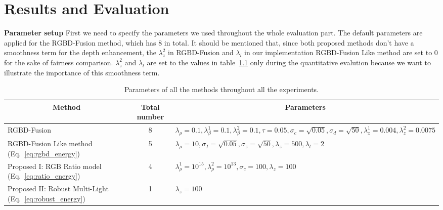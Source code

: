 \chapter{Results and Evaluation} \label{chap:result}
\textbf{Parameter setup}
First we need to specify the parameters we used throughout the whole evaluation part. 
The default parameters are applied for the RGBD-Fusion method, which has 8 in total. 
It should be mentioned that, since both proposed methods don't have a smoothness term for the depth enhancement, the $\lambda_z^2$ in RGBD-Fusion and $\lambda_l$ in our implementation RGBD-Fusion Like method are set to 0 for the sake of fairness comparison.
$\lambda_z^2$ and $\lambda_l$ are set to the values in table~\ref{tab:parameter_setup} only during the quantitative evalution because we want to illustrate the importance of this smoothness term.
\begin{table}[!ht]
\caption{Parameters of all the methods throughout all the experiments.}
\label{tab:parameter_setup}
\centering
\begin{tabular}{|m{4cm} |m{1.5cm} |m{7cm}|}
\hline
\multicolumn{1}{|c|}{Method}                               & \multicolumn{1}{c|}{Total number} & \multicolumn{1}{c|}{Parameters}                                                                                                                                          \\ \hline
RGBD-Fusion~\cite{or2015rgbd} & \multicolumn{1}{c|}{8}            &{$\lambda_\rho = 0.1, \lambda_\beta^1 = 0.1, \lambda_\beta^2 = 0.1, \tau = 0.05, \sigma_c = \sqrt{0.05}, \sigma_d = \sqrt{50}, \lambda_z^1 = 0.004, \lambda_z^2 = 0.0075$} \\ \hline
RGBD-Fusion Like method (Eq.~\ref{eq:rgbd_energy})                    & \multicolumn{1}{c|}{5}             & {$\lambda_{\rho} = 10, \sigma_I = \sqrt{0.05}, \sigma_z = \sqrt{50}, \lambda_z = 500, \lambda_l = 2$}                                                                                                                                                                         \\ \hline
Proposed I: RGB Ratio model (Eq.~\ref{eq:ratio_energy})                            & \multicolumn{1}{c|}{4}             & $\lambda_{\rho}^1 = 10^{15}, \lambda_{\rho}^2 = 10^{13}, \sigma_c = 100, \lambda_z = 100$                                                                                                                                                                                                                                                                                                                                                  \\ \hline
Proposed II: Robust Multi-Light  (Eq.~\ref{eq:robust_energy})                        & \multicolumn{1}{c|}{1}            & $\lambda_z = 100$                                                                                                                                                                          \\ \hline
\end{tabular}
\end{table}

